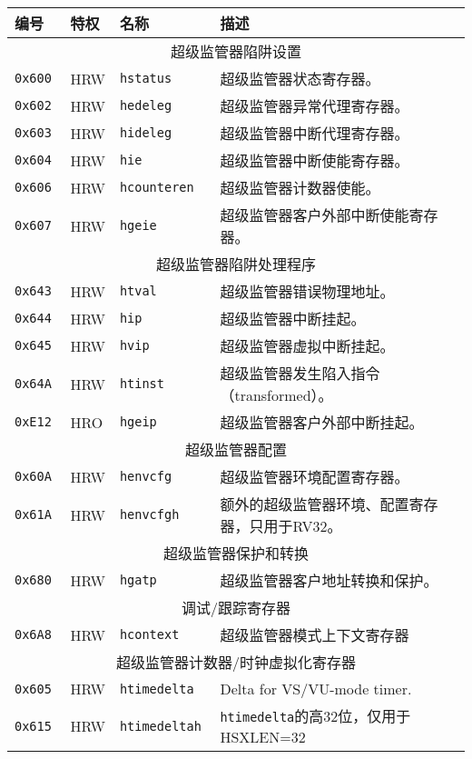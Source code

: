 \begin{table}[htb!]
\begin{center}
\begin{tabular}{|l|l|l|l|}
\hline
编号        & 特权      & 名称      & 描述 \\
\hline
\multicolumn{4}{|c|}{超级监管器陷阱设置} \\
\hline
\hline
\tt 0x600 & HRW  &\tt hstatus    & 超级监管器状态寄存器。 \\
\tt 0x602 & HRW  &\tt hedeleg    & 超级监管器异常代理寄存器。 \\
\tt 0x603 & HRW  &\tt hideleg    & 超级监管器中断代理寄存器。 \\
\tt 0x604 & HRW  &\tt hie        & 超级监管器中断使能寄存器。 \\
\tt 0x606 & HRW  &\tt hcounteren & 超级监管器计数器使能。 \\
\tt 0x607 & HRW  &\tt hgeie      & 超级监管器客户外部中断使能寄存器。 \\
\hline
\multicolumn{4}{|c|}{超级监管器陷阱处理程序} \\
\hline
\tt 0x643 & HRW  &\tt htval      & 超级监管器错误物理地址。 \\
\tt 0x644 & HRW  &\tt hip        & 超级监管器中断挂起。 \\
\tt 0x645 & HRW  &\tt hvip       & 超级监管器虚拟中断挂起。 \\
\tt 0x64A & HRW  &\tt htinst     & 超级监管器发生陷入指令（transformed）。 \\
\tt 0xE12 & HRO  &\tt hgeip      & 超级监管器客户外部中断挂起。 \\
\hline
\multicolumn{4}{|c|}{超级监管器配置} \\
\hline
\tt 0x60A & HRW  &\tt henvcfg    & 超级监管器环境配置寄存器。 \\
\tt 0x61A & HRW  &\tt henvcfgh   & 额外的超级监管器环境、配置寄存器，只用于RV32。 \\
\hline
\multicolumn{4}{|c|}{超级监管器保护和转换} \\
\hline
\tt 0x680 & HRW  &\tt hgatp      & 超级监管器客户地址转换和保护。 \\
\hline
\multicolumn{4}{|c|}{调试/跟踪寄存器} \\
\hline
\tt 0x6A8 & HRW &\tt hcontext & 超级监管器模式上下文寄存器 \\
\hline
\multicolumn{4}{|c|}{超级监管器计数器/时钟虚拟化寄存器} \\
\hline
\tt 0x605 & HRW  &\tt htimedelta   & Delta for VS/VU-mode timer. \\
\tt 0x615 & HRW  &\tt htimedeltah  & {\tt htimedelta}的高32位，仅用于HSXLEN=32 \\

\end{tabular}
\end{center}
\end{table}
